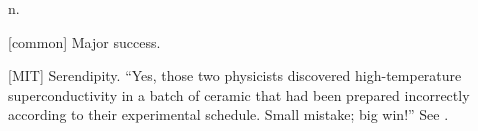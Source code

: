  n.

\begin{inparaenum}
    \item {[}common] Major success.
    \item {[}MIT] Serendipity. ``Yes, those two physicists discovered
        high-temperature superconductivity in a batch of ceramic that
        had been prepared incorrectly according to their experimental
        schedule. Small mistake; big win!'' See .
\end{inparaenum}

